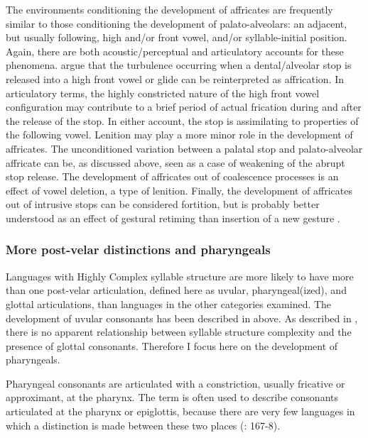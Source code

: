   The environments conditioning the development of affricates are frequently similar to those conditioning the development of palato-alveolars: an adjacent, but usually following, high and/or front vowel, and/or syllable-initial position. Again, there are both acoustic/perceptual and articulatory accounts for these phenomena. \citet{HallEtAl2006} argue that the turbulence occurring when a dental/alveolar stop is released into a high front vowel or glide can be reinterpreted as affrication. In articulatory terms, the highly constricted nature of the high front vowel configuration may contribute to a brief period of actual frication during and after the release of the stop. In either account, the stop is assimilating to properties of the following vowel. Lenition may play a more minor role in the development of affricates. The unconditioned variation between a palatal stop and palato-alveolar affricate can be, as discussed above, seen as a case of weakening of the abrupt stop release. The development of affricates out of coalescence processes is an effect of vowel deletion, a type of lenition. Finally, the development of affricates out of intrusive stops can be considered fortition, but is probably better understood as an effect of gestural retiming than insertion of a new gesture \citep[43-44]{Bybee2015b}.

\subsubsection{{More} {post-velar} {distinctions} {and} {pharyngeals}}\label{sec:4.5.2.5}

  Languages with Highly Complex syllable structure are more likely to have more than one post-velar articulation, defined here as uvular, pharyngeal(ized), and glottal articulations, than languages in the other categories examined. The development of uvular consonants has been described in  above. As described in , there is no apparent relationship between syllable structure complexity and the presence of glottal consonants. Therefore I focus here on the development of pharyngeals.

  Pharyngeal consonants are articulated with a constriction, usually fricative or approximant, at the pharynx. The term is often used to describe consonants articulated at the pharynx or epiglottis, because there are very few languages in which a distinction is made between these two places (\citealt{LadefogedMaddieson1996}: 167-8).

